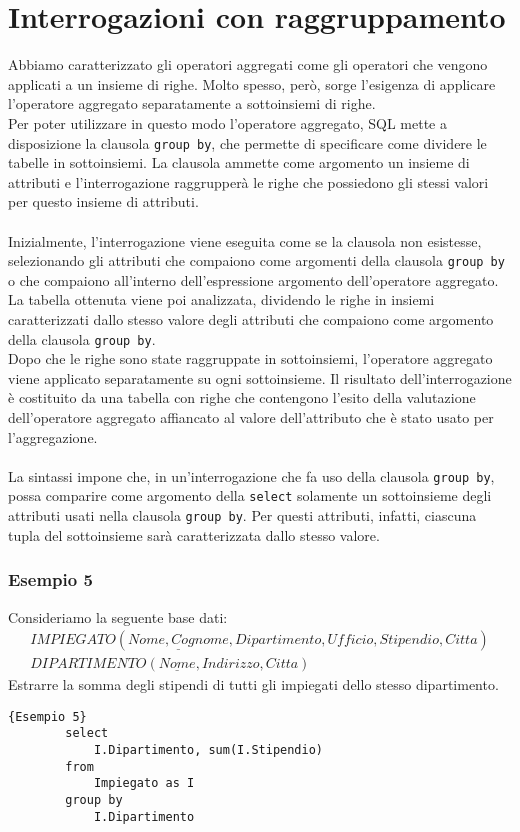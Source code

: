 \section{Interrogazioni con raggruppamento}
Abbiamo caratterizzato gli operatori aggregati come gli operatori che vengono applicati a un insieme di righe. Molto spesso, però, sorge l'esigenza di applicare l'operatore aggregato separatamente a sottoinsiemi di righe.\\
Per poter utilizzare in questo modo l'operatore aggregato, SQL mette a disposizione la clausola \texttt{group by}, che permette di specificare come dividere le tabelle in sottoinsiemi. La clausola ammette come argomento un insieme di attributi e l'interrogazione raggrupperà le righe che possiedono gli stessi valori per questo insieme di attributi.\\\\
Inizialmente, l'interrogazione viene eseguita come se la clausola non esistesse, selezionando gli attributi che compaiono come argomenti della clausola \texttt{group by} o che compaiono all'interno dell'espressione argomento dell'operatore aggregato.\\
La tabella ottenuta viene poi analizzata, dividendo le righe in insiemi caratterizzati dallo stesso valore degli attributi che compaiono come argomento della clausola \texttt{group by}.\\
Dopo che le righe sono state raggruppate in sottoinsiemi, l'operatore aggregato viene applicato separatamente su ogni sottoinsieme. Il risultato dell'interrogazione è costituito da una tabella con righe che contengono l'esito della valutazione dell'operatore aggregato affiancato al valore dell'attributo che è stato usato per l'aggregazione.\\\\
La sintassi impone che, in un'interrogazione che fa uso della clausola \texttt{group by}, possa comparire come argomento della \texttt{select} solamente un sottoinsieme degli attributi usati nella clausola \texttt{group by}. Per questi attributi, infatti, ciascuna tupla del sottoinsieme sarà caratterizzata dallo stesso valore.

\subsubsection{Esempio 5}
Consideriamo la seguente base dati:
	\begin{equation}\begin{aligned}
		IMPIEGATO (\underline{Nome, Cognome}, Dipartimento, Ufficio, Stipendio, Citta)\\
		DIPARTIMENTO (\underline{Nome}, Indirizzo, Citta)
	\end{aligned}\end{equation}
Estrarre la somma degli stipendi di tutti gli impiegati dello stesso dipartimento.
	\begin{lstlisting}{Esempio 5}
		select 
			I.Dipartimento, sum(I.Stipendio)
		from 
			Impiegato as I
		group by
			I.Dipartimento
	\end{lstlisting}

